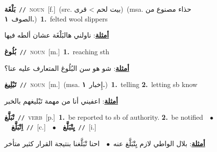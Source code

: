 \documentclass[10pt,a4paper,twoside]{article} %
\begin{document}
\begin{multicols}{2}
{\setlength\topsep{0pt}\textbf{\foreignlanguage{arabic}{بَلْغَة}}\ {\color{gray}\texttt{//}\color{black}}\ \textsc{noun}\ [f.]\ (src. \color{gray}\foreignlanguage{arabic}{بيت لحم > قرى}\color{black})\ \color{gray}(msa. \foreignlanguage{arabic}{حذاء مصنوع من الصوف}~\foreignlanguage{arabic}{\textbf{١.}})\color{black}\ \textbf{1.}~felted wool slippers\  \begin{flushright}\color{gray}\foreignlanguage{arabic}{\textbf{\underline{\foreignlanguage{arabic}{أمثلة}}}: ناولني هالبَلْغَة عشان ألطه فيها}\end{flushright}\color{black}} \vspace{2mm}

{\setlength\topsep{0pt}\textbf{\foreignlanguage{arabic}{بُلُوغ}}\ {\color{gray}\texttt{//}\color{black}}\ \textsc{noun}\ [m.]\ \textbf{1.}~reaching sth\  \begin{flushright}\color{gray}\foreignlanguage{arabic}{\textbf{\underline{\foreignlanguage{arabic}{أمثلة}}}: شو هو سن البُلُوغ المتعارف عليه عنا؟}\end{flushright}\color{black}} \vspace{2mm}

{\setlength\topsep{0pt}\textbf{\foreignlanguage{arabic}{تَبْلِيغ}}\ {\color{gray}\texttt{//}\color{black}}\ \textsc{noun}\ [m.]\ \color{gray}(msa. \foreignlanguage{arabic}{إِخبار}~\foreignlanguage{arabic}{\textbf{١.}})\color{black}\ \textbf{1.}~telling  \textbf{2.}~letting sb know\  \begin{flushright}\color{gray}\foreignlanguage{arabic}{\textbf{\underline{\foreignlanguage{arabic}{أمثلة}}}: اعفيني أنا من مهمة تَبْليغهم بالخبر}\end{flushright}\color{black}} \vspace{2mm}

{\setlength\topsep{0pt}\textbf{\foreignlanguage{arabic}{تْبَلَّغ}}\ {\color{gray}\texttt{//}\color{black}}\ \textsc{verb}\ [p.]\ \textbf{1.}~be reported to sb of authority.  \textbf{2.}~be notified\ \ $\bullet$\ \ \setlength\topsep{0pt}\textbf{\foreignlanguage{arabic}{اِتْبَلَّغ}}\ {\color{gray}\texttt{//}\color{black}}\ [c.]\ \ $\bullet$\ \ \setlength\topsep{0pt}\textbf{\foreignlanguage{arabic}{يِتْبَلَّغ}}\ {\color{gray}\texttt{//}\color{black}}\ [i.]\  \begin{flushright}\color{gray}\foreignlanguage{arabic}{\textbf{\underline{\foreignlanguage{arabic}{أمثلة}}}: بلال الواطي لازم يِتْبَلَّغ عنه\ $\bullet$\ \  احنا تْبَلَّغنا بنتيجة القرار كثير متأخر}\end{flushright}\color{black}} \vspace{2mm}


\end{multicols}
\end{document}
